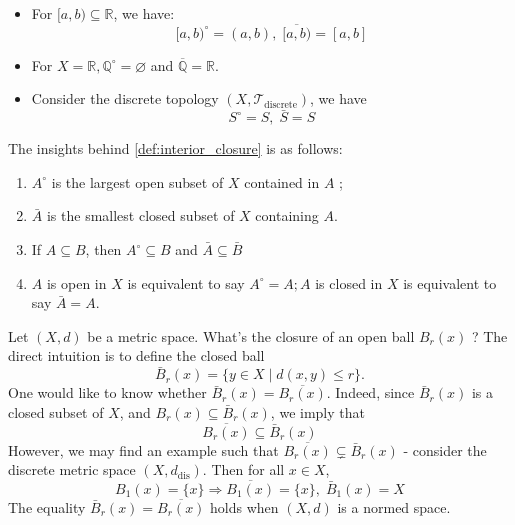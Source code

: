 \begin{example}
\begin{itemize}
\item For \(\lbrack a,b) \subseteq  \mathbb{R}\), we have:
\[
\lbrack a,b{)}^{ \circ } = \left({a,b}\right),\;\overline{\lbrack a,b)} = \left\lbrack  {a,b}\right\rbrack
\]

\item For \(X = \mathbb{R},{\mathbb{Q}}^{ \circ } = \varnothing\) and \(\overline{\mathbb{Q}} = \mathbb{R}\).

\item Consider the discrete topology \(\left({X,{\mathcal{T}}_{\text{discrete}}}\right)\), we have
\[
{S}^{ \circ } = S,\;\bar{S} = S
\]
\end{itemize}
\end{example}

The insights behind \autoref{def:interior_closure} is as follows:
\begin{proposition}
\leavevmode \medskip
\begin{enumerate}
    \item  \({A}^{ \circ }\) is the largest open subset of \(X\) contained in \(A\) ;

\item \(\bar{A}\) is the smallest closed subset of \(X\) containing \(A\).

\item If \(A \subseteq  B\), then \({A}^{ \circ } \subseteq  B\) and \(\bar{A} \subseteq  \bar{B}\)

\item \(A\) is open in \(X\) is equivalent to say \({A}^{ \circ } = A;A\) is closed in \(X\) is equivalent to say \(\bar{A} = A\).
\end{enumerate}
\end{proposition}

\begin{example} Let $(X, d)$ be a metric space. What’s the closure of an open ball \({B}_{r}\left(x\right)\) ? The direct intuition is to define the closed ball
\[
{\bar{B}}_{r}\left(x\right)  = \{ y \in  X \mid  d\left({x,y}\right)  \leq  r\}.
\]
One would like to know whether \({\bar{B}}_{r}\left(x\right)  = \overline{{B}_{r}\left(x\right)}\). Indeed, since \({\bar{B}}_{r}\left(x\right)\) is a closed subset of \(X\), and \({B}_{r}\left(x\right)  \subseteq  {\bar{B}}_{r}\left(x\right)\), we imply that
\[
\overline{{B}_{r}\left(x\right)} \subseteq  {\bar{B}}_{r}\left(x\right)
\]
However, we may find an example such that \(\overline{{B}_{r}\left(x\right)}\subsetneq {\bar{B}}_{r}\left(x\right)\) - consider the discrete metric space \(\left({X, d_{\mathrm{dis}}}\right)\). Then for all \(x \in  X\),
\[
B_1\left(x\right)  = \{ x\}  \Rightarrow  \overline{B_1\left(x\right)} = \{ x\},\;{\bar{B}}_{1}\left(x\right)  = X
\]
The equality \({\bar{B}}_{r}\left(x\right)  = \overline{{B}_{r}\left(x\right)}\) holds when $(X, d)$ is a normed space.
\end{example}

